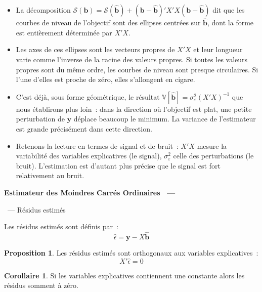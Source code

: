 \documentclass[10pt,a4paper]{article}
\makeatletter
\theoremstyle{definition}
\newtheorem{prop}{Proposition}
\newtheorem{cor}{Corollaire}
\renewcommand{\newline}{\unskip\par\vspace{1.5pt}}
\newenvironment{frame}[1][]{\par}{\par}
\newcommand{\frameheadrule}{%
  \par\nobreak\vspace{1pt}{\color{ctitle}\hrule height 0.6pt}\nobreak\vspace{4pt}}
\newcommand{\frametitle}[1]{%
  \par\addvspace{8pt plus 2pt}\needspace{6\baselineskip}%
  \noindent\begingroup\color{ctitle}\sffamily\bfseries\large #1\endgroup
  \@ifnextchar\framesubtitle{}{\frameheadrule}}
\newcommand{\framesubtitle}[1]{%
  \begingroup\color{ctitle}\sffamily\normalsize\ --- #1\endgroup\frameheadrule}
\makeatother
\begin{document}
\begin{notes}

  \begin{itemize}

  \item La décomposition $\mathcal S(\mathbf b) = \mathcal S(\hat{\mathbf b}) +
    \left(\mathbf b - \hat{\mathbf b}\right)' X'X \left(\mathbf b - \hat{\mathbf b}\right)$
    dit que les courbes de niveau de l'objectif sont des ellipses centrées
    sur $\hat{\mathbf b}$, dont la forme est entièrement déterminée par $X'X$.\newline

  \item Les axes de ces ellipses sont les vecteurs propres de $X'X$ et leur longueur
    varie comme l'inverse de la racine des valeurs propres. Si toutes les valeurs
    propres sont du même ordre, les courbes de niveau sont presque circulaires. Si
    l'une d'elles est proche de zéro, elles s'allongent en cigare.\newline

  \item C'est déjà, sous forme géométrique, le résultat
    $\mathbb V[\hat{\mathbf b}] = \sigma_{\varepsilon}^2 (X'X)^{-1}$ que nous
    établirons plus loin~: dans la direction où l'objectif est plat, une petite
    perturbation de $\mathbf y$ déplace beaucoup le minimum. La variance de
    l'estimateur est grande précisément dans cette direction.\newline

  \item Retenons la lecture en termes de signal et de bruit~: $X'X$ mesure la
    variabilité des variables explicatives (le signal), $\sigma_{\varepsilon}^2$ celle
    des perturbations (le bruit). L'estimation est d'autant plus précise que le signal
    est fort relativement au bruit.

  \end{itemize}

\end{notes}



\begin{frame}
  \frametitle{Estimateur des Moindres Carrés Ordinaires}
  \framesubtitle{Résidus estimés}

  \begin{defn}{}
    Les résidus estimés sont définis par~:
    \[
      \hat{\epsilon}  = \mathbf y - X \hat{\mathbf b}
    \]
  \end{defn}

  \bigskip

  \begin{prop}\label{prop:orthogonal_residuals}
    Les résidus estimés sont orthogonaux aux variables explicatives~:
    \[
    X'\hat\epsilon = 0
  \]
  \end{prop}

  \bigskip

  \begin{cor}\label{cor:zero_mean_residuals}
    Si les variables explicatives contiennent une constante alors les résidus somment à zéro.
  \end{cor}

\end{frame}
\end{document}

